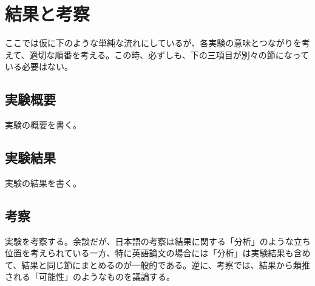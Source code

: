 \chapter{結果と考察}
\label{chap:results}

ここでは仮に下のような単純な流れにしているが、各実験の意味とつながりを考えて、適切な順番を考える。この時、必ずしも、下の三項目が別々の節になっている必要はない。

\section{実験概要}
\label{sec:expabst}

実験の概要を書く。

\section{実験結果}
\label{sec:results}

実験の結果を書く。

\section{考察}
\label{sec:discussion}

実験を考察する。余談だが、日本語の考察は結果に関する「分析」のような立ち位置を考えられている一方、特に英語論文の場合には「分析」は実験結果も含めて、結果と同じ節にまとめるのが一般的である。逆に、考察では、結果から類推される「可能性」のようなものを議論する。
